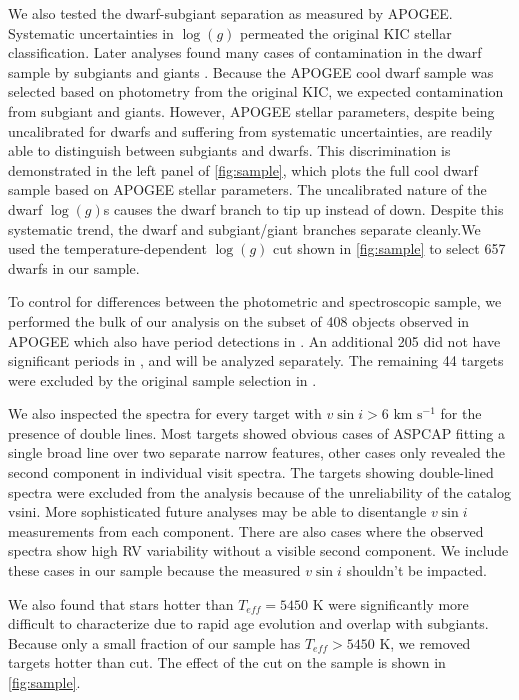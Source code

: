 \documentclass[manuscript]{aastex6}
\newcommand{\vsini}{\ensuremath{v \sin i}}
\newcommand{\Teff}{\ensuremath{T_{eff}}}
\newcommand{\logg}{\ensuremath{\log(g)}}
\newcommand{\kms}{\textrm{~km~s}\ensuremath{^{-1}}}
\begin{document}
We also tested the dwarf-subgiant separation as measured by APOGEE\@. Systematic 
uncertainties in \logg{} permeated the original KIC stellar
classification. Later analyses found many cases of contamination in the dwarf 
sample by subgiants 
and giants \citep{Mann12,Gaidos13}. Because the APOGEE cool dwarf sample was 
selected based on photometry from the original KIC, we expected contamination 
from subgiant and giants. However, APOGEE stellar parameters, 
despite being uncalibrated for dwarfs and suffering from 
systematic uncertainties, are readily able to distinguish between subgiants and 
dwarfs. This discrimination is demonstrated in the left panel of 
\cref{fig:sample}, which plots the full cool dwarf sample based on
APOGEE stellar parameters. The uncalibrated nature of the dwarf
\logg{}s causes the dwarf branch to tip up instead of down. Despite this
systematic trend, the dwarf and subgiant/giant branches separate
cleanly.We used the temperature-dependent \logg{} cut shown in 
\cref{fig:sample} to select 657 dwarfs in our sample. 

To control for differences between the photometric and spectroscopic sample,
we performed the bulk of our analysis on the subset of 408 objects
observed in APOGEE which also have period detections in \citet{McQuillan14}.
An additional 205 did not have significant periods in \citet{McQuillan14}, and
will be analyzed separately. The remaining 44 targets were excluded by
the original sample selection in \citet{McQuillan14}. 

We also inspected the spectra for every target with \(\vsini > 6 \kms\)
for the presence of double lines. Most targets showed obvious cases of ASPCAP 
fitting a single broad line over two separate narrow features, other cases 
only revealed the second component in individual visit spectra. The targets 
showing double-lined spectra were excluded from the analysis because of
the unreliability of the catalog vsini. More sophisticated future
analyses \citet{ElBadry18} may be able to disentangle \vsini{}
measurements from each component. There are
also cases where the observed spectra show high RV variability
without a visible second component. We include these cases in our sample
because the measured \vsini{} shouldn't be impacted.


We also found that stars hotter than
\(\Teff = 5450\) K were significantly more difficult to characterize due to
rapid age evolution and overlap with subgiants. Because only a small 
fraction of our sample has \(\Teff > 5450\) K, we removed targets hotter
than cut. The effect of the cut on the sample is shown in \cref{fig:sample}.
\end{document}
